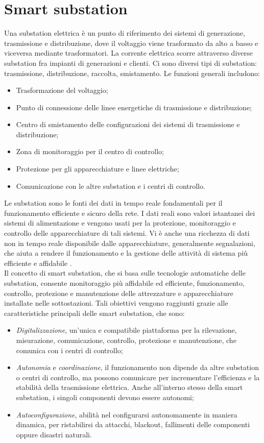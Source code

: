 \section{Smart substation}
Una substation elettrica è un punto di riferimento dei sistemi di generazione, trasmissione e distribuzione, dove il voltaggio viene trasformato da alto a basso e viceversa mediante trasformatori. La corrente elettrica scorre attraverso diverse substation fra impianti di generazioni e clienti. Ci sono diversi tipi di substation: trasmissione, distribuzione, raccolta, smistamento. Le funzioni generali includono:
\begin{itemize}
	\item Trasformazione del voltaggio;
	\item Punto di connessione delle linee energetiche di trasmissione e distribuzione;
	\item Centro di smistamento delle configurazioni dei sistemi di trasmissione e distribuzione;
	\item Zona di monitoraggio per il centro di controllo;
	\item Protezione per gli apparecchiature e linee elettriche;
	\item Comunicazione con le altre substation e i centri di controllo. 
\end{itemize} 
Le substation sono le fonti dei dati in tempo reale fondamentali per il funzionamento efficiente e sicuro della rete. I dati reali sono valori istantanei dei sistemi di alimentazione e vengono usati per la protezione, monitoraggio e controllo delle apparecchiature di tali sistemi. Vi è anche una ricchezza di dati non in tempo reale disponibile dalle apparecchiature, generalmente segnalazioni, che aiuta a rendere il funzionamento e la gestione delle attività di sistema più efficiente e affidabile \cite{visionfr}.
\\
Il concetto di smart substation, che si basa sulle tecnologie automatiche delle substation, consente monitoraggio più affidabile ed efficiente, funzionamento, controllo, protezione e manutenzione delle attrezzature e apparecchiature installate nelle sottostazioni. Tali obiettivi vengono raggiunti grazie alle caratteristiche principali delle smart substation, che sono:
\begin{itemize}
	\item \emph{Digitalizzazione}, un'unica e compatibile piattaforma per la rilevazione, misurazione, comunicazione, controllo, protezione e manutenzione, che comunica con i centri di controllo;
	\item \emph{Autonomia} e \emph{coordinazione}, il funzionamento non dipende da altre substation o centri di controllo, ma possono comunicare per incrementare l'efficienza e la stabilità della trasmissione elettrica. Anche all'interno stesso della smart substation, i singoli componenti devono essere autonomi;
	\item \emph{Autoconfigurazione}, abilità nel configurarsi autonomamente in maniera dinamica, per ristabilirsi da attacchi, blackout, fallimenti delle componenti oppure disastri naturali.   
\end{itemize}   
